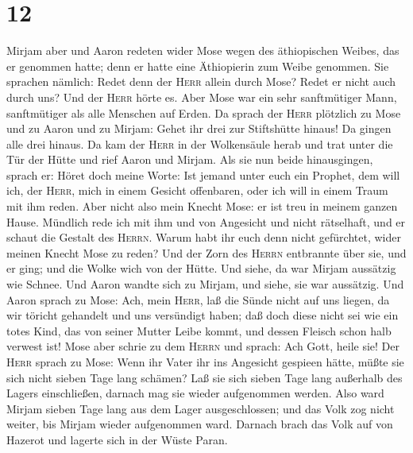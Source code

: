 \hypertarget{section-11}{%
\section{12}\label{section-11}}

 Mirjam aber und Aaron redeten wider Mose wegen des
äthiopischen Weibes, das er genommen hatte; denn er hatte eine
Äthiopierin zum Weibe genommen.  Sie sprachen nämlich:
Redet denn der \textsc{Herr} allein durch Mose? Redet er nicht auch
durch uns?  Und der \textsc{Herr} hörte es. Aber Mose war
ein sehr sanftmütiger Mann, sanftmütiger als alle Menschen auf Erden.
 Da sprach der \textsc{Herr} plötzlich zu Mose und zu
Aaron und zu Mirjam: Gehet ihr drei zur Stiftshütte hinaus! Da gingen
alle drei hinaus.  Da kam der \textsc{Herr} in der
Wolkensäule herab und trat unter die Tür der Hütte und rief Aaron und
Mirjam.  Als sie nun beide hinausgingen, sprach er: Höret
doch meine Worte: Ist jemand unter euch ein Prophet, dem will ich, der
\textsc{Herr}, mich in einem Gesicht offenbaren, oder ich will in einem
Traum mit ihm reden.  Aber nicht also mein Knecht Mose: er
ist treu in meinem ganzen Hause.  Mündlich rede ich mit
ihm und von Angesicht und nicht rätselhaft, und er schaut die Gestalt
des \textsc{Herrn}. Warum habt ihr euch denn nicht gefürchtet, wider
meinen Knecht Mose zu reden?  Und der Zorn des
\textsc{Herrn} entbrannte über sie, und er ging;  und die
Wolke wich von der Hütte. Und siehe, da war Mirjam aussätzig wie Schnee.
Und Aaron wandte sich zu Mirjam, und siehe, sie war aussätzig.
 Und Aaron sprach zu Mose: Ach, mein \textsc{Herr}, laß
die Sünde nicht auf uns liegen, da wir töricht gehandelt und uns
versündigt haben;  daß doch diese nicht sei wie ein totes
Kind, das von seiner Mutter Leibe kommt, und dessen Fleisch schon halb
verwest ist!  Mose aber schrie zu dem \textsc{Herrn} und
sprach: Ach Gott, heile sie! Der \textsc{Herr} sprach zu Mose:
 Wenn ihr Vater ihr ins Angesicht gespieen hätte, müßte
sie sich nicht sieben Tage lang schämen? Laß sie sich sieben Tage lang
außerhalb des Lagers einschließen, darnach mag sie wieder aufgenommen
werden.  Also ward Mirjam sieben Tage lang aus dem Lager
ausgeschlossen; und das Volk zog nicht weiter, bis Mirjam wieder
aufgenommen ward.  Darnach brach das Volk auf von Hazerot
und lagerte sich in der Wüste Paran.

